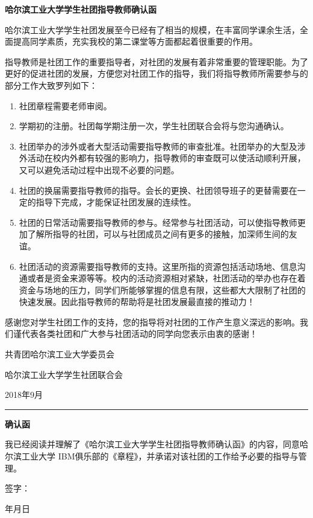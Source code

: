 \documentclass{BaseSetting}
\def\publishdate{2018年9月}
\def\clubname{IBM俱乐部}
\begin{document}
\begin{center}
    \textbf{哈尔滨工业大学学生社团指导教师确认函}
\end{center}

哈尔滨工业大学学生社团发展至今已经有了相当的规模，在丰富同学课余生活，全面提高同学素质，充实我校的第二课堂等方面都起着很重要的作用。

指导教师是社团工作的重要指导者，对社团的发展有着非常重要的管理职能。为了更好的促进社团的发展，方便您对社团工作的指导，我们将指导教师所需要参与的部分工作大致罗列如下：

\begin{enumerate}
\item 社团章程需要老师审阅。
\item 学期初的注册。社团每学期注册一次，学生社团联合会将与您沟通确认。
\item 社团举办的涉外或者大型活动需要指导教师的审查批准。社团举办的大型及涉外活动在校内外都有较强的影响力，指导教师的审查既可以使活动顺利开展，又可以避免活动过程中出现不必要的问题。
\item 社团的换届需要指导教师的指导。会长的更换、社团领导班子的更替需要在一定的指导下完成，才能保证社团发展的连续性。
\item 社团的日常活动需要指导教师的参与。经常参与社团活动，可以使指导教师更加了解所指导的社团，可以与社团成员之间有更多的接触，加深师生间的友谊。
\item 社团活动的资源需要指导教师的支持。这里所指的资源包括活动场地、信息沟通或者是资金来源等等。校内的活动资源相对紧缺，社团活动的举办也存在着资金与场地的压力，同学们所能够掌握的信息有限，这些都大大限制了社团的快速发展。因此指导教师的帮助将是社团发展最直接的推动力！
\end{enumerate}

感谢您对学生社团工作的支持，您的指导将对社团的工作产生意义深远的影响。我们谨代表各类社团和广大参与社团活动的同学向您表示由衷的感谢！

\begin{flushright}
共青团哈尔滨工业大学委员会

哈尔滨工业大学学生社团联合会

\publishdate

\end{flushright}

\begin{center}
\rule{\linewidth}{0.2mm}

\textbf{确认函}
\end{center}

我已经阅读并理解了《哈尔滨工业大学学生社团指导教师确认函》的内容，同意哈尔滨工业大学 \clubname 的《章程》，并承诺对该社团的工作给予必要的指导与管理。 


\begin{flushright}
签字：\hspace{0.2\linewidth}

年\hspace{0.05\linewidth}月\hspace{0.05\linewidth}日
\end{flushright}
\end{document}
